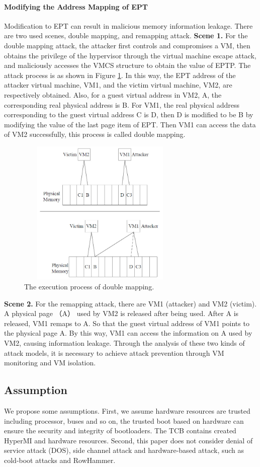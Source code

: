 \documentclass[conference]{IEEEtran}
\begin{document}
\paragraph{Modifying the Address Mapping of EPT}
Modification to EPT can result in malicious memory information leakage. There are two used scenes, double mapping, and remapping attack.
\textbf{Scene 1.} 
For the double mapping attack, the attacker first controls and compromises a VM, then obtains the privilege of the hypervisor through the virtual machine escape attack, and maliciously accesses the VMCS structure to obtain the value of EPTP. The attack process is as shown in Figure \ref{fig0}. In this way, the EPT address of the attacker virtual machine, VM1, and the victim virtual machine, VM2, are respectively obtained. Also, for a guest virtual address in VM2, A, the corresponding real physical address is B. For VM1, the real physical address corresponding to the guest virtual address C is D, then D is modified to be B by modifying the value of the last page item of EPT. Then VM1 can access the data of VM2 successfully, this process is called double mapping.
\begin{figure}
\centerline{\includegraphics[width=8cm, height=7cm]{VMCS0.jpg}}%
\caption{The execution process of double mapping. } \label{fig0}
\end{figure}
\textbf{Scene 2.}
For the remapping attack, there are VM1 (attacker) and VM2 (victim). A physical page （A） used by VM2 is released after being used. After A is released, VM1 remaps to A. So that the guest virtual address of VM1 points to the physical page A. By this way, VM1 can access the information on A used by VM2, causing information leakage.
Through the analysis of these two kinds of attack models, it is necessary to achieve attack prevention through VM monitoring and VM isolation.
\subsection{Assumption}
We propose some assumptions.
First, we assume hardware resources are trusted including processor, buses and so on, the trusted boot based on hardware can ensure the security and integrity of bootloaders. The TCB contains created HyperMI and hardware resources. Second, this paper does not consider denial of service attack (DOS), side channel attack and hardware-based attack, such as cold-boot attacks and RowHammer.
\end{document}
